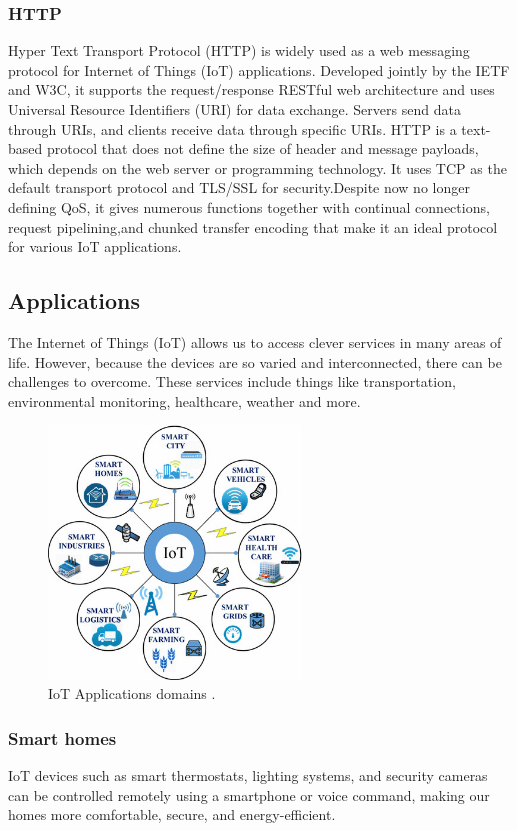 \documentclass[12pt]{report}
\begin{document}
		\subsubsection*{HTTP}
		Hyper Text Transport Protocol (HTTP) is widely used as a web messaging protocol for Internet of Things (IoT) applications. Developed jointly by the IETF and W3C, it supports the request/response RESTful web architecture and uses Universal Resource Identifiers (URI) for data exchange\cite{8088251}. Servers send data through URIs, and clients receive data through specific URIs. HTTP is a text-based protocol that does not define the size of header and message payloads, which depends on the web server or programming technology. It uses TCP as the default transport protocol and TLS/SSL for security.Despite now no longer defining QoS, it gives numerous functions together with continual connections, request pipelining,and chunked transfer encoding that make it an ideal protocol for various IoT applications. 
	\subsection{Applications}
	The Internet of Things (IoT) allows us to access clever services in many areas of life. However, because the devices are so varied and interconnected, there can be challenges to overcome. These services include things like transportation, environmental monitoring, healthcare, weather and more.
		\begin{figure}[H]
		\centering
		\includegraphics[width=0.6\textwidth]{ss}
		\caption{IoT Applications domains 
			\cite{articleKorea}.}
		\label{fig:iotapp}
	\end{figure}
	\subsubsection*{Smart homes} IoT devices such as smart thermostats, lighting systems, and security cameras can be controlled remotely using a smartphone or voice command, making our homes more comfortable, secure, and energy-efficient. 
\end{document}
